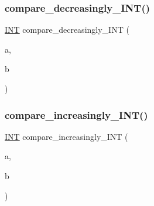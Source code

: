 \subsubsection{\texorpdfstring{compare\+\_\+decreasingly\+\_\+\+I\+N\+T()}{compare\_decreasingly\_INT()}}
{\footnotesize\ttfamily \mbox{\hyperlink{galois_8h_a09fddde158a3a20bd2dcadb609de11dc}{I\+NT}} compare\+\_\+decreasingly\+\_\+\+I\+NT (\begin{DoxyParamCaption}\item[{\mbox{\hyperlink{galois_8h_a09fddde158a3a20bd2dcadb609de11dc}{I\+NT}}}]{a,  }\item[{\mbox{\hyperlink{galois_8h_a09fddde158a3a20bd2dcadb609de11dc}{I\+NT}}}]{b }\end{DoxyParamCaption})}

\mbox{\label{sorting_8_c_aa182150f114c64f81fcefcbc6d292790}} 
\subsubsection{\texorpdfstring{compare\+\_\+increasingly\+\_\+\+I\+N\+T()}{compare\_increasingly\_INT()}}
{\footnotesize\ttfamily \mbox{\hyperlink{galois_8h_a09fddde158a3a20bd2dcadb609de11dc}{I\+NT}} compare\+\_\+increasingly\+\_\+\+I\+NT (\begin{DoxyParamCaption}\item[{\mbox{\hyperlink{galois_8h_a09fddde158a3a20bd2dcadb609de11dc}{I\+NT}}}]{a,  }\item[{\mbox{\hyperlink{galois_8h_a09fddde158a3a20bd2dcadb609de11dc}{I\+NT}}}]{b }\end{DoxyParamCaption})}

\mbox{\label{sorting_8_c_a9c2ebd300e0adb38e1b689aa10ec0f97}} 
